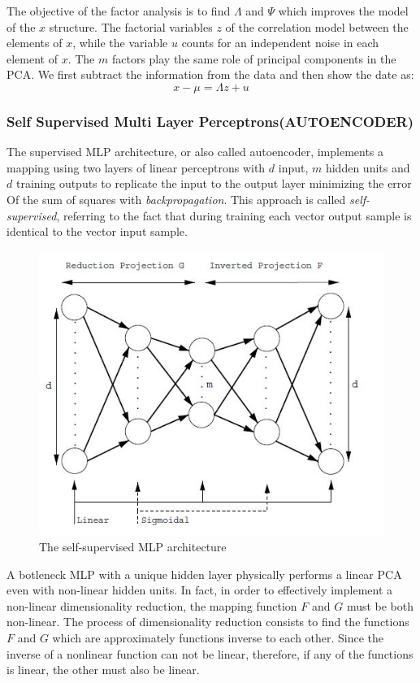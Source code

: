 \documentclass{article}
\begin{document}
The objective of the factor analysis is to find $\Lambda$ and $\Psi$ which improves the model of the $ x $ structure. The factorial variables $ z $ of the correlation model between the elements of $ x $, while the variable $ u $ counts for an independent noise in each element of $ x $. The $ m$ factors play the same role of principal components in the PCA. We first subtract the information from the data and then show the date as:
\begin{equation}
    x - \mu = \Lambda z + u
\end{equation}

\subsubsection{Self Supervised Multi Layer Perceptrons(AUTOENCODER)}
The supervised MLP architecture, or also called autoencoder, implements a mapping using two layers of linear perceptrons with $ d $ input, $ m $ hidden units and $ d $ training outputs to replicate the input to the output layer minimizing the error Of the sum of squares with \textit{backpropagation}. This approach is called \textit{self-supervised}, referring to the fact that during training each vector output sample is identical to the vector input sample.
\begin{figure}[htp]\centering
\includegraphics[width=0.6\columnwidth]{images_fractal/frac_2.JPG}
\caption{ The self-supervised MLP architecture }
\label{fig:fig_2}
\end{figure}

A botleneck MLP with a unique hidden layer physically performs a linear PCA even with non-linear hidden units. In fact, in order to effectively implement a non-linear dimensionality reduction, the mapping function $ F $ and $ G $ must be both non-linear. The process of dimensionality reduction consists to find the functions $ F $ and $ G $ which are approximately functions inverse to each other. Since the inverse of a nonlinear function can not be linear, therefore, if any of the functions is linear, the other must also be linear.
\end{document}
